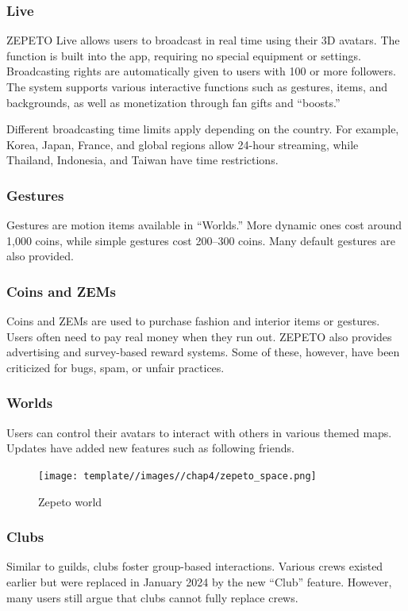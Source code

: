 \subsubsection{Live}
ZEPETO Live allows users to broadcast in real time using their 3D avatars. The function is built into the app, requiring no special equipment or settings. Broadcasting rights are automatically given to users with 100 or more followers. The system supports various interactive functions such as gestures, items, and backgrounds, as well as monetization through fan gifts and “boosts.”  

Different broadcasting time limits apply depending on the country. For example, Korea, Japan, France, and global regions allow 24-hour streaming, while Thailand, Indonesia, and Taiwan have time restrictions.  

\subsubsection{Gestures}
Gestures are motion items available in “Worlds.” More dynamic ones cost around 1,000 coins, while simple gestures cost 200–300 coins. Many default gestures are also provided.  

\subsubsection{Coins and ZEMs}
Coins and ZEMs are used to purchase fashion and interior items or gestures. Users often need to pay real money when they run out. ZEPETO also provides advertising and survey-based reward systems. Some of these, however, have been criticized for bugs, spam, or unfair practices.  

\subsubsection{Worlds}
Users can control their avatars to interact with others in various themed maps. Updates have added new features such as following friends.  

\begin{figure}
    \centering
    \texttt{[image: template//images//chap4/zepeto\_space.png]}
    \caption{Zepeto world}
    \label{fig:placeholder}
\end{figure}

\subsubsection{Clubs}
Similar to guilds, clubs foster group-based interactions. Various crews existed earlier but were replaced in January 2024 by the new “Club” feature. However, many users still argue that clubs cannot fully replace crews.  

